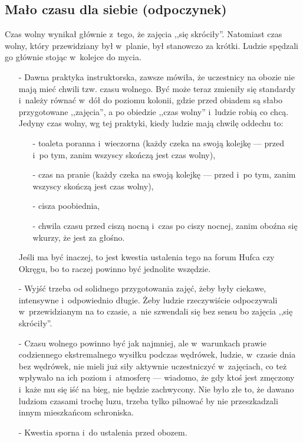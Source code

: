 \subsection{Mało czasu dla siebie (odpoczynek)}
Czas wolny wynikał głównie z~tego, że zajęcia ,,się skróciły''. Natomiast czas wolny, który przewidziany był w~planie, był stanowczo za krótki. Ludzie spędzali go głównie stojąc w~kolejce do mycia.
\begin{itemize}
\item[-] Dawna praktyka instruktorska, zawsze mówiła, że uczestnicy na obozie nie mają mieć chwili tzw. czasu wolnego. Być może teraz zmieniły się standardy i~należy równać w~dół do poziomu kolonii, gdzie przed obiadem są słabo przygotowane ,,zajęcia'', a po obiedzie ,,czas wolny'' i~ludzie robią co chcą. Jedyny czas wolny, wg tej praktyki, kiedy ludzie mają chwilę oddechu to:
\begin{itemize}
\item[-] toaleta poranna i~wieczorna (każdy czeka na swoją kolejkę --- przed i~po tym, zanim wszyscy skończą jest czas wolny),
\item[-] czas na pranie (każdy czeka na swoją kolejkę --- przed i~po tym, zanim wszyscy skończą jest czas wolny),
\item[-] cisza poobiednia,
\item[-] chwila czasu przed ciszą nocną i~czas po ciszy nocnej, zanim oboźna się wkurzy, że jest za głośno.
\end{itemize}
Jeśli ma być inaczej, to jest kwestia ustalenia tego na forum Hufca czy Okręgu, bo to raczej powinno być jednolite wszędzie.
\item[-] Wyjść trzeba od solidnego przygotowania zajęć, żeby były ciekawe, intensywne i~odpowiednio długie. Żeby ludzie rzeczywiście odpoczywali w~przewidzianym na to czasie, a~nie szwendali się bez sensu bo zajęcia ,,się skróciły''.
\item[-] Czasu wolnego powinno być jak najmniej, ale w~warunkach prawie codziennego ekstremalnego wysiłku podczas wędrówek, ludzie, w~czasie dnia bez wędrówek, nie mieli już siły aktywnie uczestniczyć w~zajęciach, co też wpływało na ich poziom i~atmosferę --- wiadomo, że gdy ktoś jest zmęczony i~każe mu się iść na bieg, nie będzie zachwycony. Nie było złe to, że dawano ludziom czasami trochę luzu, trzeba tylko pilnować by nie przeszkadzali innym mieszkańcom schroniska.
\item[-] Kwestia sporna i~do ustalenia przed obozem.
\end{itemize}
